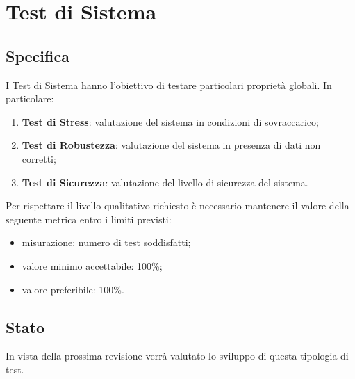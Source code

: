 \section{Test di Sistema}

	\subsection{Specifica}
		I Test di Sistema hanno l'obiettivo di testare particolari proprietà globali. In particolare:
		\begin{enumerate}
			\item{\textbf{Test di Stress}: valutazione del sistema in condizioni di sovraccarico;}
			\item{\textbf{Test di Robustezza}: valutazione del sistema in presenza di dati non corretti;}
			\item{\textbf{Test di Sicurezza}: valutazione del livello di sicurezza del sistema.}
		\end{enumerate}
		Per rispettare il livello qualitativo richiesto è necessario mantenere il valore della seguente metrica entro i limiti previsti:
		\begin{itemize}
			\item{misurazione: numero di test soddisfatti;}
			\item{valore minimo accettabile: 100\%;}
			\item{valore preferibile: 100\%.}
		\end{itemize}
	
	
	\subsection{Stato}
		In vista della prossima revisione verrà valutato lo sviluppo di questa tipologia di test.